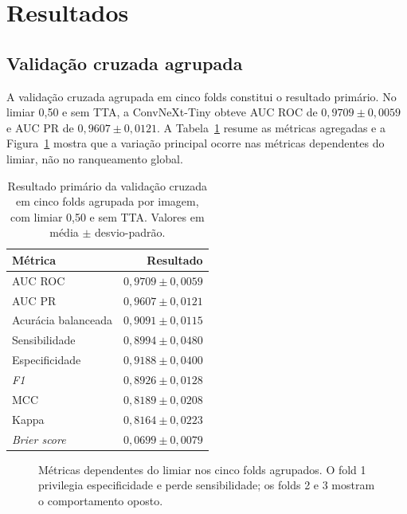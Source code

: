 ﻿\section{Resultados}

\subsection{Validação cruzada agrupada}

A validação cruzada agrupada em cinco folds constitui o resultado primário. No
limiar 0,50 e sem TTA, a ConvNeXt-Tiny obteve AUC ROC de
$0{,}9709\pm0{,}0059$ e AUC PR de $0{,}9607\pm0{,}0121$. A
Tabela~\ref{tab:cv-media} resume as métricas agregadas e a
Figura~\ref{fig:cv-folds} mostra que a variação principal ocorre nas métricas
dependentes do limiar, não no ranqueamento global.

\begin{table}[ht]
\centering
\caption{Resultado primário da validação cruzada em cinco folds agrupada por
imagem, com limiar 0,50 e sem TTA. Valores em média $\pm$ desvio-padrão.}
\label{tab:cv-media}
\begin{tabular}{lr}
\toprule
Métrica & Resultado \\
\midrule
AUC ROC & $0{,}9709\pm0{,}0059$ \\
AUC PR & $0{,}9607\pm0{,}0121$ \\
Acurácia balanceada & $0{,}9091\pm0{,}0115$ \\
Sensibilidade & $0{,}8994\pm0{,}0480$ \\
Especificidade & $0{,}9188\pm0{,}0400$ \\
\emph{F1} & $0{,}8926\pm0{,}0128$ \\
MCC & $0{,}8189\pm0{,}0208$ \\
Kappa & $0{,}8164\pm0{,}0223$ \\
\emph{Brier score} & $0{,}0699\pm0{,}0079$ \\
\bottomrule
\end{tabular}
\end{table}

\begin{figure}[ht]
\centering
{}
\caption{Métricas dependentes do limiar nos cinco folds agrupados. O fold 1
privilegia especificidade e perde sensibilidade; os folds 2 e 3 mostram o
comportamento oposto.}
\label{fig:cv-folds}
\end{figure}

